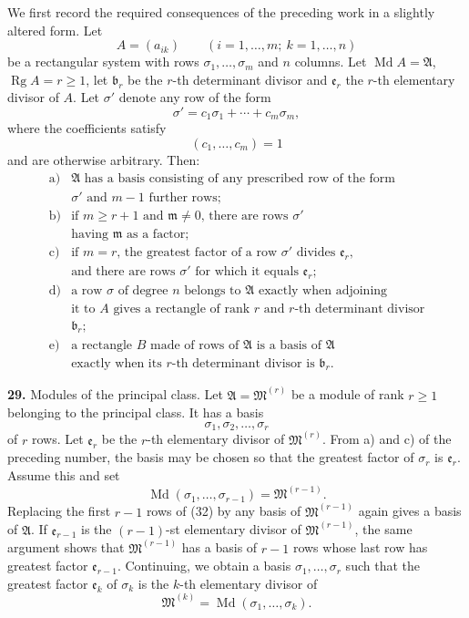 \documentclass[11pt,a4paper]{article}
\begin{document}
We first record the required consequences of the preceding work in a slightly altered form. Let
\[
 A=(a_{ik})\qquad(i=1,\ldots,m;\ k=1,\ldots,n)
\]
be a rectangular system with rows \(\sigma_1,\ldots,\sigma_m\) and \(n\) columns. Let \(\operatorname{Md}A=\mathfrak A\), \(\operatorname{Rg}A=r\ge1\), let \(\mathfrak b_r\) be the \(r\)-th determinant divisor and \(\mathfrak e_r\) the \(r\)-th elementary divisor of \(A\). Let \(\sigma'\) denote any row of the form
\[
 \sigma'=c_1\sigma_1+\cdots+c_m\sigma_m,
\]
where the coefficients satisfy
\[
 (c_1,\ldots,c_m)=1 \tag{31}
\]
and are otherwise arbitrary. Then:
\[
\begin{array}{ll}
\text{a)}&\text{\(\mathfrak A\) has a basis consisting of any prescribed row of the form}\\
&\text{\(\sigma'\) and \(m-1\) further rows;}\\
\text{b)}&\text{if \(m\ge r+1\) and \(\mathfrak m\ne0\), there are rows \(\sigma'\)}\\
&\text{having \(\mathfrak m\) as a factor;}\\
\text{c)}&\text{if \(m=r\), the greatest factor of a row \(\sigma'\) divides \(\mathfrak e_r\),}\\
&\text{and there are rows \(\sigma'\) for which it equals \(\mathfrak e_r\);}\\
\text{d)}&\text{a row \(\sigma\) of degree \(n\) belongs to \(\mathfrak A\) exactly when adjoining}\\
&\text{it to \(A\) gives a rectangle of rank \(r\) and \(r\)-th determinant divisor}\\
&\text{\(\mathfrak b_r\);}\\
\text{e)}&\text{a rectangle \(B\) made of rows of \(\mathfrak A\) is a basis of \(\mathfrak A\)}\\
&\text{exactly when its \(r\)-th determinant divisor is \(\mathfrak b_r\).}
\end{array}
\]

\textbf{29.} Modules of the principal class. Let \(\mathfrak A=\mathfrak M^{(r)}\) be a module of rank \(r\ge1\) belonging to the principal class. It has a basis
\[
 \sigma_1,\sigma_2,\ldots,\sigma_r \tag{32}
\]
of \(r\) rows. Let \(\mathfrak e_r\) be the \(r\)-th elementary divisor of \(\mathfrak M^{(r)}\). From a) and c) of the preceding number, the basis may be chosen so that the greatest factor of \(\sigma_r\) is \(\mathfrak e_r\). Assume this and set
\[
 \operatorname{Md}(\sigma_1,\ldots,\sigma_{r-1})=\mathfrak M^{(r-1)}.
\]
Replacing the first \(r-1\) rows of (32) by any basis of \(\mathfrak M^{(r-1)}\) again gives a basis of \(\mathfrak A\). If \(\mathfrak e_{r-1}\) is the \((r-1)\)-st elementary divisor of \(\mathfrak M^{(r-1)}\), the same argument shows that \(\mathfrak M^{(r-1)}\) has a basis of \(r-1\) rows whose last row has greatest factor \(\mathfrak e_{r-1}\). Continuing, we obtain a basis \(\sigma_1,\ldots,\sigma_r\) such that the greatest factor \(\mathfrak e_k\) of \(\sigma_k\) is the \(k\)-th elementary divisor of
\[
 \mathfrak M^{(k)}=\operatorname{Md}(\sigma_1,\ldots,\sigma_k).
\]
\end{document}
